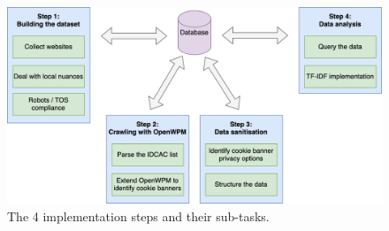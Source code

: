 \documentclass[../main.tex]{subfiles}
\begin{document}
\begin{figure}[ht]
    \centering
    \includegraphics[width=\textwidth]{images/implementation/steps.png}
    \caption{The 4 implementation steps and their sub-tasks.}
    \label{fig:impl_steps}
\end{figure}
\end{document}
